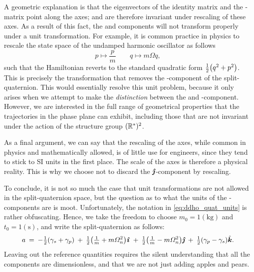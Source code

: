 A geometric explanation is that the eigenvectors of the identity matrix and the \quatk-matrix point along the axes; and are therefore invariant under rescaling of these axes. As a result of this fact, the \quati and \quatj components will not transform properly under a unit transformation. For example, it is common practice in physics to rescale the state space of the undamped harmonic oscillator as follows \cite{Dekker1981,Dedene1980}
\begin{equation}
     p \mapsto \frac{p}{m} \qquad q \mapsto m\Omega q,
\end{equation}
such that the Hamiltonian reverts to the standard quadratic form $\tfrac{1}{2}\qty(q^2 + p^2)$. This is precisely the transformation that removes the \quatj-component of the split-quaternion. This would essentially resolve this unit problem, because it only arises when we attempt to make the \emph{distinction} between the \quati and \quatj-component.
However, we are interested in the full range of geometrical properties that the trajectories in the phase plane can exhibit, including those that are not invariant under the action of the structure group \((\mathbb{R}^*)^2\). %

As a final argument, we can say that the rescaling of the axes, while common in physics and mathematically allowed, is of little use for engineers, since they tend to stick to SI units in the first place. The scale of the axes is therefore a physical reality. This is why we choose not to discard the \(\quatj\)-component by rescaling.

To conclude, it is not so much the case that unit transformations are not allowed in the split-quaternion space, but the question as to what the units of the \quatj-components are is moot. Unfortunately, the notation in \cref{eq:ddho_quat_units} is rather obfuscating. Hence, we take the freedom to choose \(m_0 = 1 (\si{\kilogram})\) and \(t_0 = 1 (\si{\second})\), and write the split-quaternion as follows:
\begin{equation}
    a\:=\: -\tfrac{1}{2}\qty(\gamma_s + \gamma_p)\:+\:\tfrac{1}{2}\qty(\tfrac{1}{m} + m\Omega_n^2)\quati\:+\:\tfrac{1}{2}\qty(\tfrac{1}{m} - m\Omega_n^2)\quatj\:+\:\tfrac{1}{2}\qty(\gamma_p - \gamma_s)\quatk. 
    \label{eq:ddho_quat}
\end{equation}
Leaving out the reference quantities requires the silent understanding that all the components are dimensionless, and that we are not just adding apples and pears. 

